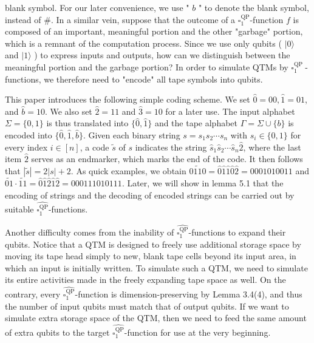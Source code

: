 \documentclass[10pt]{article}
\begin{document}
blank symbol. For our later convenience, we use " $b$ " to denote the blank symbol, instead of $\#$. In a similar vein, suppose that the outcome of a $\square_{1}^{\mathrm{QP}}$-function $f$ is composed of an important, meaningful portion and the other "garbage" portion, which is a remnant of the computation process. Since we use only qubits ( $|0\rangle$ and $|1\rangle$ ) to express inputs and outputs, how can we distinguish between the meaningful portion and the garbage portion? In order to simulate QTMs by $\square_{1}^{\text {QP }}$-functions, we therefore need to "encode" all tape symbols into qubits.

This paper introduces the following simple coding scheme. We set $\hat{0}=00, \hat{1}=01$, and $\hat{b}=10$. We also set $\hat{2}=11$ and $\hat{3}=10$ for a later use. The input alphabet $\Sigma=\{0,1\}$ is thus translated into $\{\hat{0}, \hat{1}\}$ and the tape alphabet $\Gamma=\Sigma \cup\{b\}$ is encoded into $\{\hat{0}, \hat{1}, \hat{b}\}$. Given each binary string $s=s_{1} s_{2} \cdots s_{n}$ with $s_{i} \in\{0,1\}$ for every index $i \in[n]$, a code $\tilde{s}$ of $s$ indicates the string $\hat{s}_{1} \hat{s}_{2} \cdots \hat{s}_{n} \hat{2}$, where the last item $\hat{2}$ serves as an endmarker, which marks the end of the code. It then follows that $|\tilde{s}|=2|s|+2$. As quick examples, we obtain $\widetilde{0110}=\hat{0} \hat{1} \hat{1} \hat{0} \hat{2}=0001010011$ and $\widetilde{01} \cdot \widetilde{11}=\hat{0} \hat{1} \hat{2} \hat{1} \hat{2}=000111010111$. Later, we will show in lemma 5.1 that the encoding of strings and the decoding of encoded strings can be carried out by suitable $\widehat{\square_{1}^{\mathrm{QP}}}$-functions.

Another difficulty comes from the inability of $\widehat{\square_{1}^{\mathrm{QP}}}$-functions to expand their qubits. Notice that a QTM is designed to freely use additional storage space by moving its tape head simply to new, blank tape cells beyond its input area, in which an input is initially written. To simulate such a QTM, we need to simulate its entire activities made in the freely expanding tape space as well. On the contrary, every $\widehat{\square_{1}^{\mathrm{QP}}}$-function is dimension-preserving by Lemma 3.4(4), and thus the number of input qubits must match that of output qubits. If we want to simulate extra storage space of the QTM, then we need to feed the same amount of extra qubits to the target $\widehat{\square_{1}^{\mathrm{QP}}}$-function for use at the very beginning.
\end{document}
